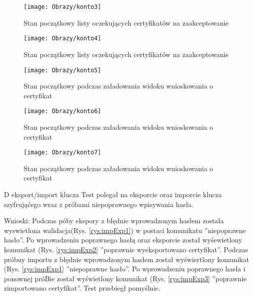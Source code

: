 \begin{enumerate*}
\begin{figure}[ht!]
			\begin{minipage}{0.2\textwidth}
				\texttt{[image: Obrazy/konto3]}
				\caption{Stan początkowy listy oczekujących certyfikatów na zaakceptowanie }
				\label{rys:zarzadzanieKontem3}
			\end{minipage}
			
			\begin{minipage}{0.2\textwidth}
				\texttt{[image: Obrazy/konto4]}
				\caption{Stan początkowy listy oczekujących certyfikatów na zaakceptowanie }
				\label{rys:zarzadzanieKontem4}
			\end{minipage}
			
			
			\begin{minipage}{0.2\textwidth}
				\texttt{[image: Obrazy/konto5]}
				\caption{Stan początkowy podczas załadowania widoku wnioskowania o certyfikat}
				\label{rys:zarzadzanieKontem5}
			\end{minipage}
		
		
			\begin{minipage}{0.2\textwidth}
			\texttt{[image: Obrazy/konto6]}
			\caption{Stan początkowy podczas załadowania widoku wnioskowania o certyfikat}
			\label{rys:zarzadzanieKontem6}
		\end{minipage}
	
		\begin{minipage}{0.2\textwidth}
		\texttt{[image: Obrazy/konto7]}
		\caption{Stan początkowy podczas załadowania widoku wnioskowania o certyfikat}
		\label{rys:zarzadzanieKontem7}
	\end{minipage}

			
		\end{figure}
		
	\item  D eksport/import klucza
	Test polegał na eksporcie oraz imporcie klucza szyfrująćego wraz z próbami niepoprawnego wpisywania hasła.
	
	Wnioski: Podczas póby ekspory z błędnie wprowadzonym hasłem została wyswietlona walidacja(Rys. \ref{rys:impExp1}) w postaci komunikatu ''niepoprawne hasło''. Po wprowadzeniu poprawnego hasłą oraz eksporcie został wyśewietlony komunikat (Rys. \ref{rys:impExp2} ''poprawnie wyeksportowano certyfikat''. Podczas próbuy importu z błędnie wprowadzonym hasłem został wyświertlony komunikat (Rys. \ref{rys:impExp1} ''niepoprawne hasło''. Po wprowadzeniu poprawnego hasła i ponownej próBie został wyświetlony komunikat (Rys. \ref{rys:impExp3} ''poprawnie zimportowano certyfikat''. Test przebiegł pomyślnie.
	

\end{enumerate*}
